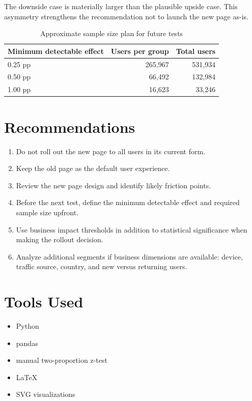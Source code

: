 \documentclass[11pt,a4paper]{article}
\begin{document}
The downside case is materially larger than the plausible upside case.
This asymmetry strengthens the recommendation not to launch the new page as-is.

\begin{table}[H]
\centering
\begin{tabular}{lrr}
\toprule
\textbf{Minimum detectable effect} & \textbf{Users per group} & \textbf{Total users} \\
\midrule
0.25 pp & 265,967 & 531,934 \\
0.50 pp & 66,492 & 132,984 \\
1.00 pp & 16,623 & 33,246 \\
\bottomrule
\end{tabular}
\caption{Approximate sample size plan for future tests}
\end{table}

\section{Recommendations}

\begin{enumerate}
    \item Do not roll out the new page to all users in its current form.
    \item Keep the old page as the default user experience.
    \item Review the new page design and identify likely friction points.
    \item Before the next test, define the minimum detectable effect and required sample size upfront.
    \item Use business impact thresholds in addition to statistical significance when making the rollout decision.
    \item Analyze additional segments if business dimensions are available: device, traffic source, country, and new versus returning users.
\end{enumerate}

\section{Tools Used}

\begin{itemize}
    \item Python
    \item pandas
    \item manual two-proportion z-test
    \item LaTeX
    \item SVG visualizations
\end{itemize}
\end{document}
